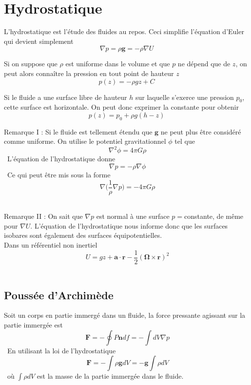 \documentclass[10pt,a4paper]{book}
\begin{document}
\section{Hydrostatique}

L'hydrostatique est l'étude des fluides au repos. Ceci simplifie l'équation d'Euler qui devient simplement
\begin{equation}
\nabla p =\rho \mathbf{g}=-\rho \nabla U
\end{equation}

Si on suppose que $\rho$ est uniforme dans le volume et que $p$ ne dépend que de $z$, on peut alors connaître la pression en tout point de hauteur $z$ 
\begin{equation}
p(z)=-\rho gz+C
\end{equation}

Si le fluide a une surface libre de hauteur $h$ sur laquelle s'exerce une pression $p_0$, cette surface est horizontale. On peut donc exprimer la constante pour obtenir 
\begin{equation}
p(z)=p_0+\rho g(h-z)
\end{equation}

Remarque I : Si le fluide est tellement étendu que $\mathbf{g}$ ne peut plus être considéré comme uniforme. On utilise le potentiel gravitationnel $\phi$ tel que \[\ \nabla ^2\phi = 4\pi G\rho \]\ 
L'équation de l'hydrostatique donne \[\ \nabla p = -\rho \nabla \phi \]\
Ce qui peut être mis sous la forme \[\ \nabla \bigg (\frac{1}{\rho}\nabla p \bigg )=-4\pi G\rho \]\

Remarque II : On sait que $\nabla p$ est normal à une surface $p=$constante, de même pour $\nabla U$. L'équation de l'hydrostatique nous informe donc que les surfaces isobares sont également des surfaces équipotentielles.\\
Dans un référentiel non inertiel \[\ U=gz+\mathbf{a\cdot r}-\frac{1}{2}(\mathbf{\Omega} \times \mathbf{r})^2 \]\

\subsection{Poussée d'Archimède}

Soit un corps en partie immergé dans un fluide, la force pressante agissant sur la partie immergée est \[\ \mathbf{F}=-\oint P\mathbf{n}df = - \int dV\nabla p \]\ 
En utilisant la loi de l'hydrostatique \[\ \mathbf{F}=-\int \rho\mathbf{g}dV=-\mathbf{g}\int \rho dV \]\
où $\int \rho dV$ est la masse de la partie immergée dans le fluide.\\
\end{document}
